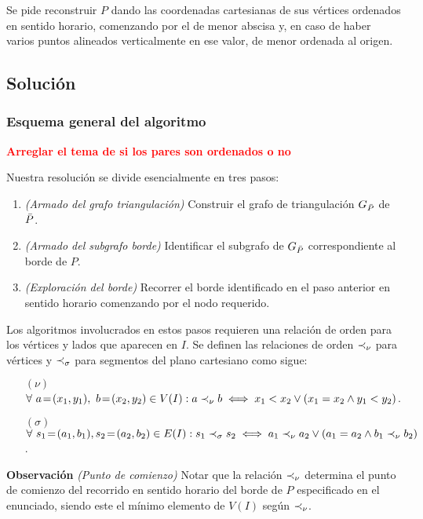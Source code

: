 \medskip

Se pide reconstruir $P$ dando las coordenadas cartesianas de sus vértices ordenados en sentido horario, comenzando por el de menor abscisa y, en caso de haber varios puntos alineados verticalmente en ese valor, de menor ordenada al origen.

\subsection{Solución}

\subsubsection{Esquema general del algoritmo}

\textcolor{red}{\textbf{Arreglar el tema de si los pares son ordenados o no}}

\bigskip

Nuestra resolución se divide esencialmente en tres pasos:

\begin{enumerate}
\setlength\itemsep{0em}
\item \textit{(Armado del grafo triangulación)} Construir el grafo de triangulación $G_{\bar{P}}$ de $\bar{P}$.
\item \textit{(Armado del subgrafo borde)} Identificar el subgrafo de $G_{\bar{P}}$ correspondiente al borde de $P$.
\item \textit{(Exploración del borde)} Recorrer el borde identificado en el paso anterior en sentido horario comenzando por el nodo requerido.
\end{enumerate}

Los algoritmos involucrados en estos pasos requieren una relación de orden para los vértices y lados que aparecen en $I$. Se definen las relaciones de orden $\prec_{\nu}$ para vértices y $\prec_{\sigma}$ para segmentos del plano cartesiano como sigue:

\begin{itemize}
\item[$( \nu )$] $\forall \ a\!=\!(x_1,y_1), \ b\!=\!(x_2,y_2) \in V(I): a \prec_{\nu} b \iff x_1 < x_2 \vee (x_1 = x_2 \wedge y_1 < y_2)$.
\item[$( \sigma )$] $\forall \ s_1\!=\!(a_1,b_1), s_2\!=\!(a_2,b_2) \in E(I): s_1 \prec_{\sigma} s_2 \iff a_1 \prec_{\nu} a_2 \vee (a_1 = a_2 \wedge b_1 \prec_{\nu} b_2)$.
\end{itemize}

\textbf{Observación} \textit{(Punto de comienzo)} Notar que la relación $\prec_{\nu}$ determina el punto de comienzo del recorrido en sentido horario del borde de $P$ especificado en el enunciado, siendo este el mínimo elemento de $V(I)$ según $\prec_{\nu}$.

